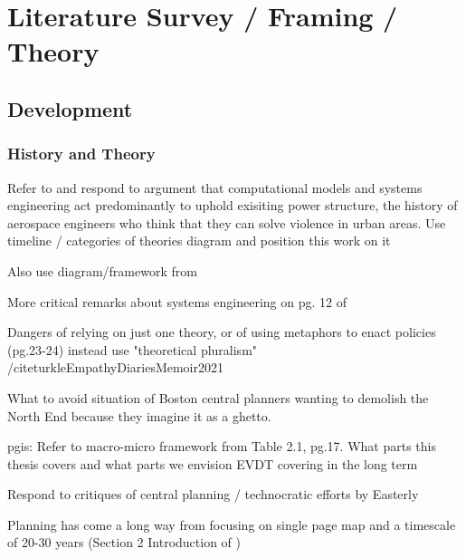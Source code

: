 \chapter{Literature Survey / Framing / Theory}


\section{Development}

\subsection{History and Theory}

Refer to and respond to argument that computational models and systems engineering act predominantly to uphold exisiting power structure, the history of aerospace engineers who think that they can solve violence in urban areas. Use timeline / categories of theories diagram and position this work on it \cite{mazza2017}

Also use diagram/framework from \cite{marcuseThreeHistoricCurrents2016}

More critical remarks about systems engineering on pg. 12 of \cite{robinsonDecisionmakingUrbanPlanning1972}

Dangers of relying on just one theory, or of using metaphors to enact policies (pg.23-24) \cite{ostromGoverningCommonsEvolution2015} instead use "theoretical pluralism" /cite{turkleEmpathyDiariesMemoir2021}

What to avoid situation of Boston central planners wanting to demolish the North End because they imagine it as a ghetto. \cite{jacobsDeathLifeGreat2016}

\ac{pgis}: Refer to macro-micro framework from Table 2.1, pg.17. What parts this thesis covers and what parts we envision EVDT covering in the long term \cite{jankowskiGISGroupDecision2001}

Respond to critiques of central planning / technocratic efforts by Easterly \cite{easterly2015}

Planning has come a long way from focusing on single page map and a timescale of 20-30 years (Section 2 Introduction of \cite{robinsonDecisionmakingUrbanPlanning1972})

